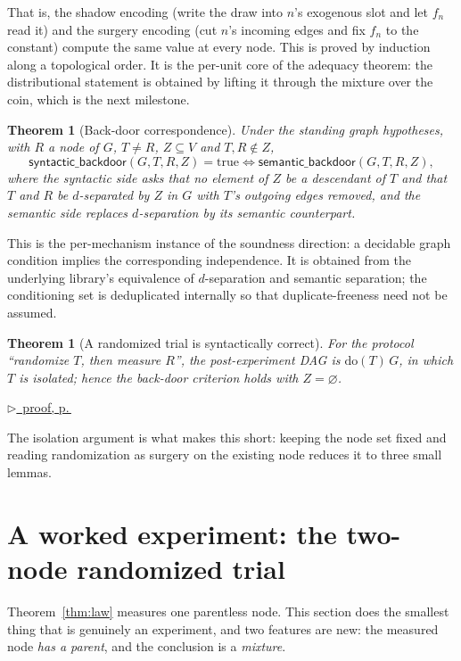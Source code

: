 \documentclass[11pt,a4paper]{article}
\theoremstyle{definition}
\theoremstyle{plain}
\newtheorem{theorem}[definition]{Theorem}
\theoremstyle{remark}
\newcommand{\pfref}[1]{%
  \par\smallskip\noindent
  \hyperref[pf:#1]{\small$\triangleright$\ proof, p.\,\pageref{pf:#1}}\par\smallskip}
\begin{document}
That is, the shadow encoding (write the draw into $n$'s exogenous slot and
let $f_n$ read it) and the surgery encoding (cut $n$'s incoming edges and
fix $f_n$ to the constant) compute the same value at every node. This is
proved by induction along a topological order. It is the per-unit core of
the adequacy theorem: the distributional statement is obtained by lifting
it through the mixture over the coin, which is the next milestone.

\begin{theorem}[Back-door correspondence]
Under the standing graph hypotheses, with $R$ a node of $G$, $T \neq R$,
$Z \subseteq V$ and $T, R \notin Z$,
\[
  \mathsf{syntactic\_backdoor}(G,T,R,Z) = \mathrm{true}
  \iff
  \mathsf{semantic\_backdoor}(G,T,R,Z),
\]
where the syntactic side asks that no element of $Z$ be a descendant of $T$
and that $T$ and $R$ be $d$-separated by $Z$ in $G$ with $T$'s outgoing
edges removed, and the semantic side replaces $d$-separation by its
semantic counterpart.
\end{theorem}

This is the per-mechanism instance of the soundness direction: a decidable
graph condition implies the corresponding independence. It is obtained from
the underlying library's equivalence of $d$-separation and semantic
separation; the conditioning set is deduplicated internally so that
duplicate-freeness need not be assumed.

\begin{theorem}[A randomized trial is syntactically correct]
\label{thm:rctsyncorrect}
For the protocol ``randomize $T$, then measure $R$'', the post-experiment
DAG is $\mathrm{do}(T)\,G$, in which $T$ is \emph{isolated}; hence the
back-door criterion holds with $Z = \varnothing$.
\end{theorem}

\pfref{thm:rctsyncorrect}

The isolation argument is what makes this short: keeping the node set fixed
and reading randomization as surgery on the existing node reduces it to
three small lemmas.

\section{A worked experiment: the two-node randomized trial}
\label{sec:rct2}

Theorem~\ref{thm:law} measures one parentless node. This section does the
smallest thing that is genuinely an experiment, and two features are new:
the measured node \emph{has a parent}, and the conclusion is a
\emph{mixture}.
\end{document}
